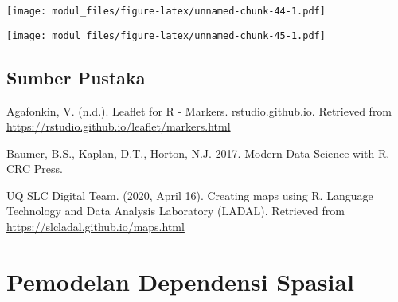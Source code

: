 \documentclass[
]{book}
\newenvironment{Shaded}{\begin{snugshade}}{\end{snugshade}}
\newcommand{\DataTypeTok}[1]{\textcolor[rgb]{0.13,0.29,0.53}{#1}}
\newcommand{\DecValTok}[1]{\textcolor[rgb]{0.00,0.00,0.81}{#1}}
\newcommand{\KeywordTok}[1]{\textcolor[rgb]{0.13,0.29,0.53}{\textbf{#1}}}
\newcommand{\NormalTok}[1]{#1}
\newcommand{\OperatorTok}[1]{\textcolor[rgb]{0.81,0.36,0.00}{\textbf{#1}}}
\newcommand{\StringTok}[1]{\textcolor[rgb]{0.31,0.60,0.02}{#1}}
\begin{document}
\begin{Shaded}
\end{Shaded}

\texttt{[image: modul\_files/figure-latex/unnamed-chunk-44-1.pdf]}

\begin{Shaded}
\end{Shaded}

\texttt{[image: modul\_files/figure-latex/unnamed-chunk-45-1.pdf]}

\hypertarget{sumber-pustaka}{%
\section{Sumber Pustaka}\label{sumber-pustaka}}

Agafonkin, V. (n.d.). Leaflet for R - Markers. rstudio.github.io. Retrieved from \url{https://rstudio.github.io/leaflet/markers.html}

Baumer, B.S., Kaplan, D.T., Horton, N.J. 2017. Modern Data Science with R. CRC Press.

UQ SLC Digital Team. (2020, April 16). Creating maps using R. Language Technology and Data Analysis Laboratory (LADAL). Retrieved from \url{https://slcladal.github.io/maps.html}

\hypertarget{pemodelan-dependensi-spasial}{%
\chapter{Pemodelan Dependensi Spasial}\label{pemodelan-dependensi-spasial}}
\end{document}

